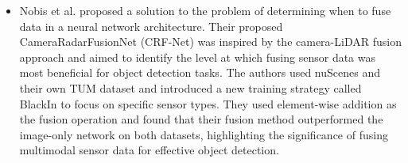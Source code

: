 \documentclass[rnd]{mas_proposal}
\begin{document}
\begin{itemize}
      \item Nobis et al. \cite{nobis2019deep} proposed a solution to the problem of determining when to fuse data in a neural network architecture. Their proposed CameraRadarFusionNet (CRF-Net) was inspired by the camera-LiDAR fusion approach \cite{yu2019multi, caltagirone2019lidar} and aimed to identify the level at which fusing sensor data was most beneficial for object detection tasks. The authors used nuScenes \cite{caesar2020nuscenes} and their own TUM dataset and introduced a new training strategy called BlackIn to focus on specific sensor types. They used element-wise addition as the fusion operation and found that their fusion method outperformed the image-only network on both datasets, highlighting the significance of fusing multimodal sensor data for effective object detection.


\end{itemize}
\end{document}
